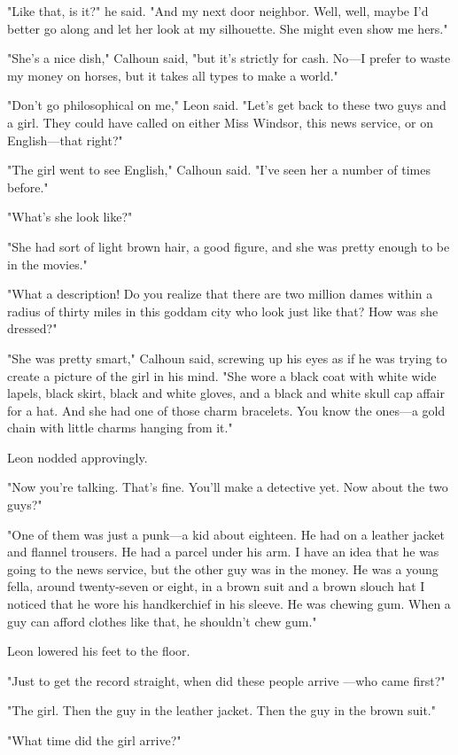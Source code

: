 \documentclass{novel}
\begin{document}
"Like that, is it?" he said. "And my next door neighbor. Well, well, maybe I'd better go along and let her look at my silhouette. She might even show me hers."

"She's a nice dish," Calhoun said, "but it's strictly for cash. No—I prefer to waste my money on horses, but it takes all types to make a world."

"Don't go philosophical on me," Leon said. "Let's get back to these two guys and a girl. They could have called on either Miss Windsor, this news service, or on English—that right?"

"The girl went to see English," Calhoun said. "I've seen her a number of times before."

"What's she look like?"

"She had sort of light brown hair, a good figure, and she was pretty enough to be in the movies."

"What a description! Do you realize that there are two million dames within a radius of thirty miles in this goddam city who look just like that? How was she dressed?"

"She was pretty smart," Calhoun said, screwing up his eyes as if he was trying to create a picture of the girl in his mind. "She wore a black coat with white wide lapels, black skirt, black and white gloves, and a black and white skull cap affair for a hat. And she had one of those charm bracelets. You know the ones—a gold chain with little charms hanging from it."

Leon nodded approvingly.

"Now you're talking. That's fine. You'll make a detective yet. Now about the two guys?"

"One of them was just a punk—a kid about eighteen. He had on a leather jacket and flannel trousers. He had a parcel under his arm. I have an idea that he was going to the news service, but the other guy was in the money. He was a young fella, around twenty-seven or eight, in a brown suit and a brown slouch hat I noticed that he wore his handkerchief in his sleeve. He was chewing gum. When a guy can afford clothes like that, he shouldn't chew gum."

Leon lowered his feet to the floor.

"Just to get the record straight, when did these people arrive —who came first?"

"The girl. Then the guy in the leather jacket. Then the guy in the brown suit."

"What time did the girl arrive?"
\end{document}
